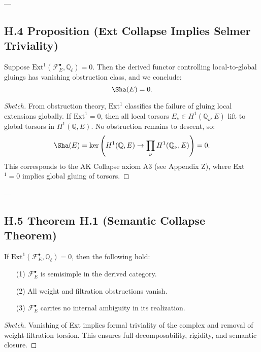 ---

\subsection*{H.4 Proposition (Ext Collapse Implies Selmer Triviality)}

\begin{proposition}
Suppose \( \mathrm{Ext}^1(\mathcal{F}_E^\bullet, \mathbb{Q}_\ell) = 0 \).  
Then the derived functor controlling local-to-global gluings has vanishing obstruction class, and we conclude:
\[
\Sha(E) = 0.
\]
\end{proposition}

\begin{proof}[Sketch]
From obstruction theory, \( \mathrm{Ext}^1 \) classifies the failure of gluing local extensions globally.  
If \( \mathrm{Ext}^1 = 0 \), then all local torsors \( E_\nu \in H^1(\mathbb{Q}_\nu, E) \) lift to global torsors in \( H^1(\mathbb{Q}, E) \).  
No obstruction remains to descent, so:
\[
\Sha(E) = \ker\left(H^1(\mathbb{Q}, E) \to \prod_\nu H^1(\mathbb{Q}_\nu, E)\right) = 0.
\]
This corresponds to the AK Collapse axiom A3 (see Appendix Z), where Ext$^1 = 0$ implies global gluing of torsors.
\end{proof}

---

\subsection*{H.5 Theorem H.1 (Semantic Collapse Theorem)}

\begin{theorem}
If \( \mathrm{Ext}^1(\mathcal{F}_E^\bullet, \mathbb{Q}_\ell) = 0 \), then the following hold:
\begin{itemize}
  \item[(1)] \( \mathcal{F}_E^\bullet \) is semisimple in the derived category.
  \item[(2)] All weight and filtration obstructions vanish.
  \item[(3)] \( \mathcal{F}_E^\bullet \) carries no internal ambiguity in its realization.
\end{itemize}
\end{theorem}

\begin{proof}[Sketch]
Vanishing of Ext implies formal triviality of the complex and removal of weight-filtration torsion.  
This ensures full decomposability, rigidity, and semantic closure.
\end{proof}

